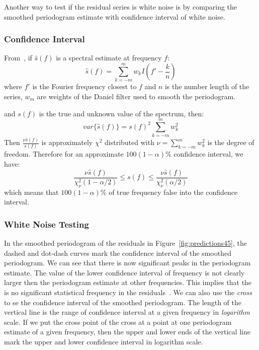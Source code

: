 \documentclass[12pt]{article}
\begin{document}
Another way to test if the residual series is white noise is by comparing the
smoothed periodogram estimate with confidence interval of white noise.

\subsubsection{Confidence Interval}
From~\cite{bloomfieldFourierTimeSeries}, if $\hat{s}(f)$ is a spectral estimate
at frequency $f$: 
\begin{equation}
\hat{s}(f)=\sum_{k=-m}^mw_kI(f'-\frac{k}{n})
\end{equation}
where $f'$ is the Fourier frequency closest to $f$ and $n$ is the number length
of the series, $w_m$ are weights of the Daniel filter used to smooth the
periodogram.

and $s(f)$ is the true and unknown value of the spectrum, then:
\begin{equation}
var\{\hat{s}(f)\}=s(f)^2\sum_{k=-m}^mw_k^2
\end{equation}
Then
$\frac{\nu \hat{s}(f)}{s(f)}$ is approximately $\chi^2$ distributed with
$\nu=\sum_{k=-m}^mw_k^2$ is the degree of freedom. Therefore for an approximate
$100(1-\alpha)\%$ confidence interval, we have:
\begin{equation}\label{eqn:confidenceInterval}
\frac{\nu\hat{s}(f)}{\chi_{\nu}^2(1-\alpha/2)}\leq s(f)\leq
\frac{\nu\hat{s}(f)}{\chi_{\nu}^2(\alpha/2)}
\end{equation}
which means that $100(1-\alpha)\%$ of true frequency false into the confidence
interval.
\subsubsection{White Noise Testing}
In the smoothed periodogram of the residuals in Figure~\ref{fig:predictions45},
the dashed and dot-dash curves mark the confidence interval of the smoothed
periodogram. We can see that there is now significant peaks in the periodogram
estimate. The value of the lower confidence interval of frequency is not clearly
larger then the periodogram estimate at other frequencies. This implies that the
is no significant statistical frequency in the residuals~\cite{CryerTimeSeries}.
We can also use the \textit{cross} to se the confidence interval of the smoothed
periodogram. The length of the vertical line is the range of confidence interval
at a given frequency in \textit{logarithm} scale. If we put the cross point of
the cross at a point at one periodogram estimate of a given frequency, then the
upper and lower ends of the vertical line mark the upper and lower confidence
interval in logarithm scale.
\end{document}
